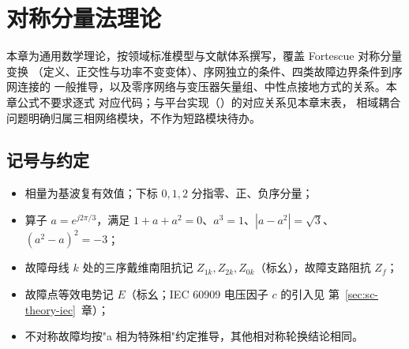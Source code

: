 
\section{对称分量法理论}\label{sec:sc-theory-symcomp}

\begin{theorynote}
本章为通用数学理论，按领域标准模型与文献体系撰写，覆盖 Fortescue 对称分量变换
（定义、正交性与功率不变变体）、序网独立的条件、四类故障边界条件到序网连接的
一般推导，以及零序网络与变压器矢量组、中性点接地方式的关系。本章公式不要求逐式
对应代码；与平台实现（）的对应关系见本章末表，
相域耦合问题明确归属三相网络模块，不作为短路模块待办。
\end{theorynote}

\subsection{记号与约定}
\begin{itemize}
  \item 相量为基波复有效值；下标 $0,1,2$ 分指零、正、负序分量；
  \item 算子 $a=e^{j2\pi/3}$，满足 $1+a+a^2=0$、$a^3=1$、$|a-a^2|=\sqrt3$、$(a^2-a)^2=-3$；
  \item 故障母线 $k$ 处的三序戴维南阻抗记 $Z_{1k},Z_{2k},Z_{0k}$（标幺），故障支路阻抗 $Z_f$；
  \item 故障点等效电势记 $E$（标幺；IEC 60909 电压因子 $c$ 的引入见
        第~\ref{sec:sc-theory-iec}~章）；
  \item 不对称故障均按"a 相为特殊相"约定推导，其他相对称轮换结论相同。
\end{itemize}

